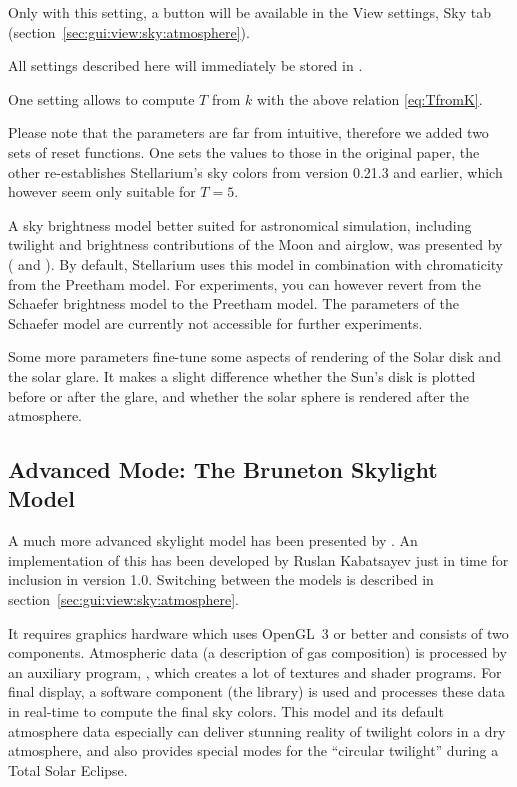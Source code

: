Only with this setting, a button  will be
available in the View settings, Sky tab (section~\ref{sec:gui:view:sky:atmosphere}).

All settings described here will immediately be stored in . 

One setting allows to compute $T$ from $k$ with the above relation
\ref{eq:TfromK}.

Please note that the parameters are far from intuitive, therefore we
added two sets of reset functions. One sets the values to those in the
original paper, the other re-establishes Stellarium's sky colors from
version 0.21.3 and earlier, which however seem only suitable for
$T=5$.

A sky brightness model better suited for astronomical simulation,
including twilight and brightness contributions of the Moon and
airglow, was presented by \citeauthor{Schaefer:Limits-Archaeo}
(\citeyear{Schaefer:Limits-Archaeo} and
\citeyear{Schaefer:Limits}). By default, Stellarium uses this model in
combination with chromaticity from the Preetham model. For
experiments, you can however revert from the Schaefer brightness model
to the Preetham model. The parameters of the Schaefer model are
currently not accessible for further experiments.

Some more parameters fine-tune some aspects of rendering of the Solar
disk and the solar glare. It makes a slight difference whether the
Sun's disk is plotted before or after the glare, and whether the solar
sphere is rendered after the atmosphere. 

\subsection{Advanced Mode: The Bruneton Skylight Model}
\label{sec:skylight:Bruneton}

A much more advanced skylight model has been presented by
\citet{Bruneton:2008}. An implementation of this has been developed by
Ruslan Kabatsayev just in time for inclusion in version 1.0. Switching
between the models is described in
section~\ref{sec:gui:view:sky:atmosphere}.

It requires graphics hardware which uses OpenGL~3 or better and
consists of two components.  Atmospheric data (a description of gas
composition) is processed by an auxiliary program,
, which creates a lot of textures and shader
programs. For final display, a software component (the
 library) is used and processes these data in
real-time to compute the final sky colors. This model and its default
atmosphere data especially can deliver stunning reality of twilight
colors in a dry atmosphere, and also provides special modes for the
``circular twilight'' during a Total Solar Eclipse.

